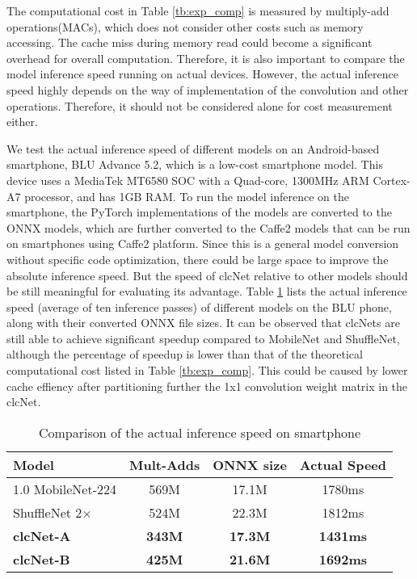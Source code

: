 \documentclass[10pt,twocolumn,letterpaper]{article}
\begin{document}
The computational cost in Table \ref{tb:exp_comp} is measured by multiply-add operations(MACs), which does not consider other costs such as memory accessing. The cache miss during memory read could become a significant overhead for overall computation. Therefore, it is also important to compare the model inference speed running on actual devices. However, the actual inference speed highly depends on the way of implementation of the convolution and other operations. Therefore, it should not be considered alone for cost measurement either. 

We test the actual inference speed of different models on an Android-based smartphone, BLU Advance 5.2, which is a low-cost smartphone model. This device uses a MediaTek MT6580 SOC with a Quad-core, 1300MHz ARM Cortex-A7 processor, and has 1GB RAM. To run the model inference on the smartphone, the PyTorch implementations of the models are converted to the ONNX models, which are further converted to the Caffe2 models that can be run on smartphones using Caffe2 platform. Since this is a general model conversion without specific code optimization, there could be large space to improve the absolute inference speed. But the speed of clcNet relative to other models should be still meaningful for evaluating its advantage. Table \ref{tb:actual_inf} lists the actual inference speed (average of ten inference passes) of different models on the BLU phone, along with their converted ONNX file sizes. It can be observed that clcNets are still able to achieve significant speedup compared to MobileNet and ShuffleNet, although the percentage of speedup is lower than that of the theoretical computational cost listed in Table \ref{tb:exp_comp}. This could be caused by lower cache effiency after partitioning further the 1x1 convolution weight matrix in the clcNet. 

\begin{table}[h!]\small
\begin{center}
\begin{tabular}{l|c|c|c}
\hline
Model  & Mult-Adds & ONNX size & Actual Speed \\
\hline\hline
1.0 MobileNet-224  & 569M & 17.1M & 1780ms\\
ShuffleNet 2$\times$  & 524M & 22.3M  & 1812ms\\
\hline
\textbf{clcNet-A}  & \textbf{343M} & \textbf{17.3M} & \textbf{1431ms}\\
\textbf{clcNet-B}  & \textbf{425M} & \textbf{21.6M} & \textbf{1692ms}\\
\hline
\end{tabular}
\end{center}
\caption{Comparison of the actual inference speed on smartphone}
\label{tb:actual_inf}
\end{table}
\end{document}
